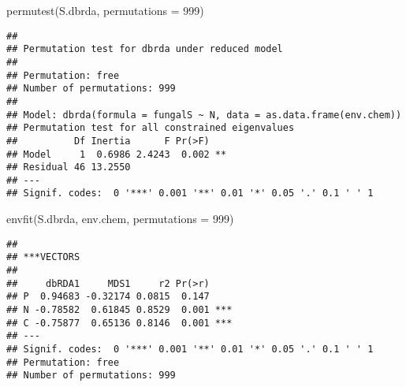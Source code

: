 \documentclass[
]{article}
\newenvironment{Shaded}{\begin{snugshade}}{\end{snugshade}}
\newcommand{\AttributeTok}[1]{\textcolor[rgb]{0.77,0.63,0.00}{#1}}
\newcommand{\DecValTok}[1]{\textcolor[rgb]{0.00,0.00,0.81}{#1}}
\newcommand{\FunctionTok}[1]{\textcolor[rgb]{0.00,0.00,0.00}{#1}}
\newcommand{\NormalTok}[1]{#1}
\begin{document}
\begin{Shaded}
\begin{Highlighting}[]
\FunctionTok{permutest}\NormalTok{(S.dbrda, }\AttributeTok{permutations =} \DecValTok{999}\NormalTok{)}
\end{Highlighting}
\end{Shaded}

\begin{verbatim}
## 
## Permutation test for dbrda under reduced model 
## 
## Permutation: free
## Number of permutations: 999
##  
## Model: dbrda(formula = fungalS ~ N, data = as.data.frame(env.chem))
## Permutation test for all constrained eigenvalues
##          Df Inertia      F Pr(>F)   
## Model     1  0.6986 2.4243  0.002 **
## Residual 46 13.2550                 
## ---
## Signif. codes:  0 '***' 0.001 '**' 0.01 '*' 0.05 '.' 0.1 ' ' 1
\end{verbatim}

\begin{Shaded}
\begin{Highlighting}[]
\FunctionTok{envfit}\NormalTok{(S.dbrda, env.chem, }\AttributeTok{permutations =} \DecValTok{999}\NormalTok{)}
\end{Highlighting}
\end{Shaded}

\begin{verbatim}
## 
## ***VECTORS
## 
##     dbRDA1     MDS1     r2 Pr(>r)    
## P  0.94683 -0.32174 0.0815  0.147    
## N -0.78582  0.61845 0.8529  0.001 ***
## C -0.75877  0.65136 0.8146  0.001 ***
## ---
## Signif. codes:  0 '***' 0.001 '**' 0.01 '*' 0.05 '.' 0.1 ' ' 1
## Permutation: free
## Number of permutations: 999
\end{verbatim}
\end{document}
